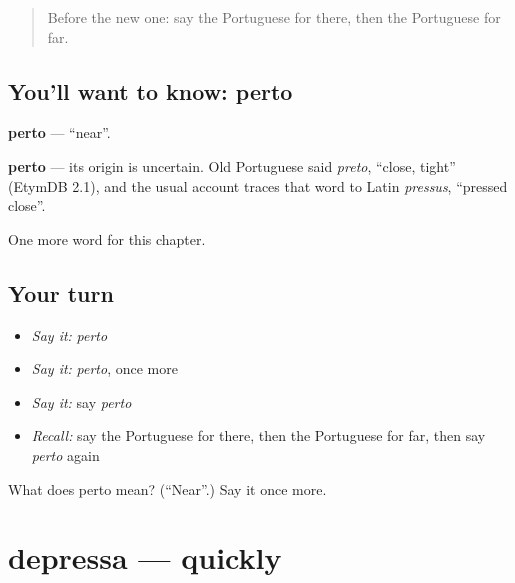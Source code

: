 \label{lesson:PT-C72-perto}



\begin{quote}
Before the new one: say the Portuguese for there, then the Portuguese for far.
\end{quote}

\subsection*{You'll want to know: perto}
\textbf{perto} — \textquotedblleft{}near\textquotedblright{}.

\begin{cousinweb}
\textbf{perto} — its origin is uncertain. Old Portuguese said \emph{preto}, \textquotedblleft{}close, tight\textquotedblright{} (EtymDB 2.1), and the usual account traces that word to Latin \emph{pressus}, \textquotedblleft{}pressed close\textquotedblright{}.
\end{cousinweb}

\begin{grammarlens}[title={What you've built}]
One more word for this chapter.
\end{grammarlens}

\subsection*{Your turn}
\begin{itemize}
\raggedright
  \item \emph{Say it:} \emph{perto}
  \item \emph{Say it:} \emph{perto}, once more
  \item \emph{Say it:} say \emph{perto}
  \item \emph{Recall:} say the Portuguese for there, then the Portuguese for far, then say \emph{perto} again
\end{itemize}

\begin{tcolorbox}[breakable,colback=teal!4,colframe=teal!35!black,title={Before you move on}]
What does perto mean? (\textquotedblleft{}Near\textquotedblright{}.) Say it once more.
\end{tcolorbox}
\section[depressa]{depressa — quickly}

\label{lesson:PT-C72-depressa}



